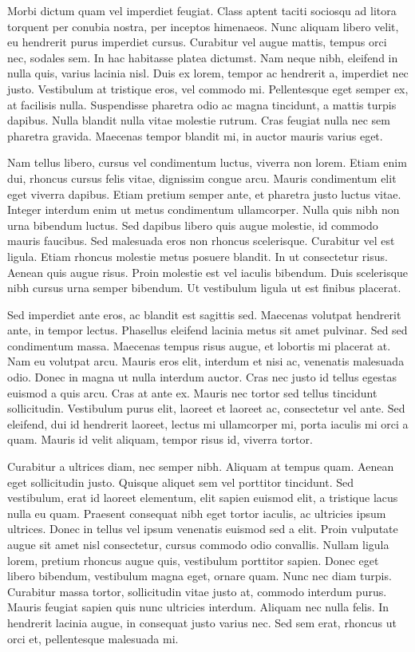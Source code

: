 \documentclass{homework}
\begin{document}
Morbi dictum quam vel imperdiet feugiat. Class aptent taciti sociosqu ad litora torquent per conubia nostra, per inceptos himenaeos. Nunc aliquam libero velit, eu hendrerit purus imperdiet cursus. Curabitur vel augue mattis, tempus orci nec, sodales sem. In hac habitasse platea dictumst. Nam neque nibh, eleifend in nulla quis, varius lacinia nisl. Duis ex lorem, tempor ac hendrerit a, imperdiet nec justo. Vestibulum at tristique eros, vel commodo mi. Pellentesque eget semper ex, at facilisis nulla. Suspendisse pharetra odio ac magna tincidunt, a mattis turpis dapibus. Nulla blandit nulla vitae molestie rutrum. Cras feugiat nulla nec sem pharetra gravida. Maecenas tempor blandit mi, in auctor mauris varius eget.

Nam tellus libero, cursus vel condimentum luctus, viverra non lorem. Etiam enim dui, rhoncus cursus felis vitae, dignissim congue arcu. Mauris condimentum elit eget viverra dapibus. Etiam pretium semper ante, et pharetra justo luctus vitae. Integer interdum enim ut metus condimentum ullamcorper. Nulla quis nibh non urna bibendum luctus. Sed dapibus libero quis augue molestie, id commodo mauris faucibus. Sed malesuada eros non rhoncus scelerisque. Curabitur vel est ligula. Etiam rhoncus molestie metus posuere blandit. In ut consectetur risus. Aenean quis augue risus. Proin molestie est vel iaculis bibendum. Duis scelerisque nibh cursus urna semper bibendum. Ut vestibulum ligula ut est finibus placerat.

Sed imperdiet ante eros, ac blandit est sagittis sed. Maecenas volutpat hendrerit ante, in tempor lectus. Phasellus eleifend lacinia metus sit amet pulvinar. Sed sed condimentum massa. Maecenas tempus risus augue, et lobortis mi placerat at. Nam eu volutpat arcu. Mauris eros elit, interdum et nisi ac, venenatis malesuada odio. Donec in magna ut nulla interdum auctor. Cras nec justo id tellus egestas euismod a quis arcu. Cras at ante ex. Mauris nec tortor sed tellus tincidunt sollicitudin. Vestibulum purus elit, laoreet et laoreet ac, consectetur vel ante. Sed eleifend, dui id hendrerit laoreet, lectus mi ullamcorper mi, porta iaculis mi orci a quam. Mauris id velit aliquam, tempor risus id, viverra tortor.

Curabitur a ultrices diam, nec semper nibh. Aliquam at tempus quam. Aenean eget sollicitudin justo. Quisque aliquet sem vel porttitor tincidunt. Sed vestibulum, erat id laoreet elementum, elit sapien euismod elit, a tristique lacus nulla eu quam. Praesent consequat nibh eget tortor iaculis, ac ultricies ipsum ultrices. Donec in tellus vel ipsum venenatis euismod sed a elit. Proin vulputate augue sit amet nisl consectetur, cursus commodo odio convallis. Nullam ligula lorem, pretium rhoncus augue quis, vestibulum porttitor sapien. Donec eget libero bibendum, vestibulum magna eget, ornare quam. Nunc nec diam turpis. Curabitur massa tortor, sollicitudin vitae justo at, commodo interdum purus. Mauris feugiat sapien quis nunc ultricies interdum. Aliquam nec nulla felis. In hendrerit lacinia augue, in consequat justo varius nec. Sed sem erat, rhoncus ut orci et, pellentesque malesuada mi.
\end{document}
